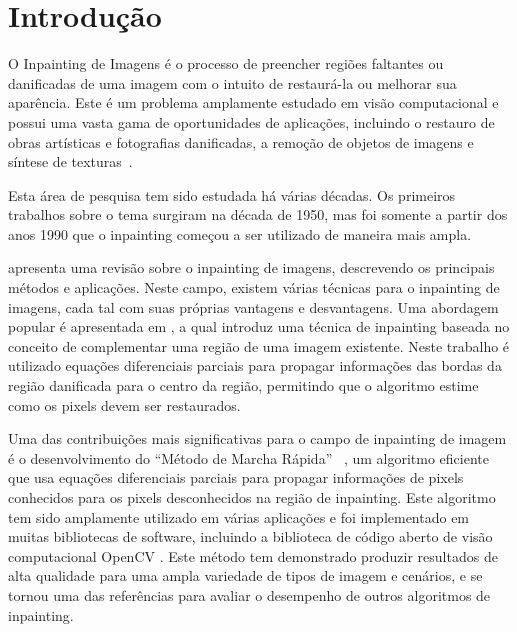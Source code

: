 
\section{Introdução} \label{introduction}
O Inpainting  de Imagens é o processo de preencher regiões faltantes ou danificadas de uma imagem com o intuito de restaurá-la ou melhorar sua aparência. Este é um problema amplamente estudado em visão computacional e possui uma vasta gama de oportunidades de aplicações, incluindo o restauro de obras artísticas e fotografias danificadas, a remoção de objetos de imagens e síntese de texturas~\cite{criminisi2004region}.

Esta área de pesquisa tem sido estudada há várias décadas. Os primeiros trabalhos sobre o tema surgiram na década de 1950, mas foi somente a partir dos anos 1990 que o inpainting começou a ser utilizado de maneira mais ampla.

\cite{Elharrouss2019} apresenta uma revisão sobre o inpainting de imagens, descrevendo os principais métodos e aplicações. Neste campo, existem várias técnicas para o inpainting de imagens, cada tal com suas próprias vantagens e desvantagens. Uma abordagem popular é apresentada em \cite{Bertalmio2000}, a qual introduz uma técnica de inpainting baseada no conceito de complementar uma região de uma imagem existente. Neste trabalho é utilizado equações diferenciais parciais para propagar informações das bordas da região danificada para o centro da região, permitindo que o algoritmo estime como os pixels devem ser restaurados.

Uma das contribuições mais significativas para o campo de inpainting de imagem é o desenvolvimento do ``Método de Marcha Rápida'' ~\cite{Telea2004}, um algoritmo eficiente que usa equações diferenciais parciais para propagar informações de pixels conhecidos para os pixels desconhecidos na região de inpainting. Este algoritmo tem sido amplamente utilizado em várias aplicações e foi implementado em muitas bibliotecas de software, incluindo a biblioteca de código aberto de visão computacional OpenCV \cite{OpenCV}. Este método tem demonstrado produzir resultados de alta qualidade para uma ampla variedade de tipos de imagem e cenários, e se tornou uma das referências para avaliar o desempenho de outros algoritmos de inpainting.

